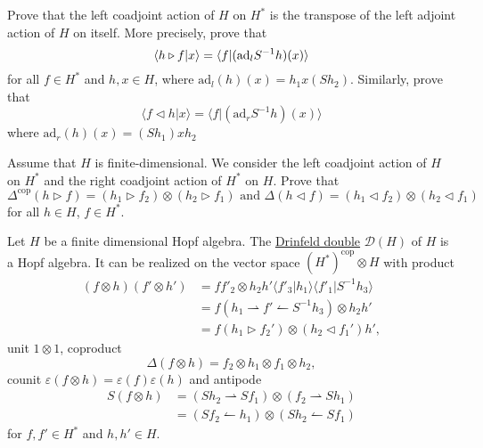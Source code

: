 \begin{exercise}
Prove that the left coadjoint action of $H$ on $H^*$ is the
transpose of the left adjoint action of $H$ on itself. More
precisely, prove that
\[
\langle h\triangleright f|x\rangle=\langle f|(\mathrm{ad}_l S^{-1}h)(x)\rangle\\
\]
for all $f\in H^*$ and $h,x \in H$,
where $\mathrm{ad}_l(h)(x)=h_1x(Sh_2)$. 
Similarly, prove that 
\[
\langle f\triangleleft h|x\rangle=\langle f|(\mathrm{ad}_r S^{-1}h)(x)\rangle
\]
where $\mathrm{ad}_r(h)(x)=(Sh_1)xh_2$
\end{exercise}

\begin{exercise}
Assume that $H$ is finite-dimensional. We consider the left coadjoint action of
$H$ on $H^*$ and the right coadjoint action of $H^*$ on $H$. Prove that 
\begin{equation*}
	\Delta^{\mathrm{cop}}(h\triangleright f)=(h_1\triangleright f_2)\otimes(h_2\triangleright f_1)\text{ and }
	\Delta(h\triangleleft f)=(h_1\triangleleft f_2)\otimes(h_2\triangleleft f_1)
\end{equation*}
for all $h\in H$, $f\in H^*$.
\end{exercise}

\begin{theorem}
\label{theorem:double}
Let $H$ be a finite dimensional Hopf algebra. The \underline{Drinfeld double}
$\mathcal{D}(H)$ of $H$ is a Hopf algebra. It can be realized on the vector
space $(H^{*})^{\text{cop}}\otimes H$ with product
\begin{align*}
(f\otimes h)(f'\otimes h')&=ff'_{2}\otimes h_{2}h'\langle f'_{3}|h_{1}\rangle\langle f'_{1}|S^{-1}h_{3}\rangle\\
&=f(h_1\rightharpoonup f'\leftharpoonup S^{-1}h_3)\otimes h_2h'\\
&=f(h_1\triangleright f_2')\otimes (h_2\triangleleft f_1')h',
\end{align*}
unit $1\otimes1$, coproduct 
\[
\Delta(f\otimes h)=f_{2}\otimes h_{1}\otimes f_{1}\otimes h_{2},
\]
counit $\varepsilon(f\otimes h)=\varepsilon(f)\varepsilon(h)$ and
antipode 
\begin{align*}
S(f\otimes h)&=(Sh_2\rightharpoonup Sf_1)\otimes (f_2\rightharpoonup Sh_1)\\
&=(Sf_2\leftharpoonup h_1)\otimes(Sh_2\leftharpoonup Sf_1)
\end{align*}
for $f,f'\in H^*$ and $h,h'\in H$. 
\end{theorem}

